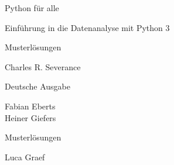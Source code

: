 \begin{titlepage}
\begin{center}
\vspace*{15mm}

\sffamily
\LARGE
Python für alle

\Large
Einführung in die Datenanalyse mit Python 3

\vspace{5mm}

Musterlösungen

\vspace{15mm}

\Large
Charles R. Severance

\vspace{10mm}

\normalsize
Deutsche Ausgabe

\vspace{2mm}

\large
Fabian Eberts\\
Heiner Giefers

\vspace{5mm}

\normalsize
Musterlösungen

\vspace{2mm}

\large
Luca Graef



\end{center}
\end{titlepage}

\normalsize
\normalfont
